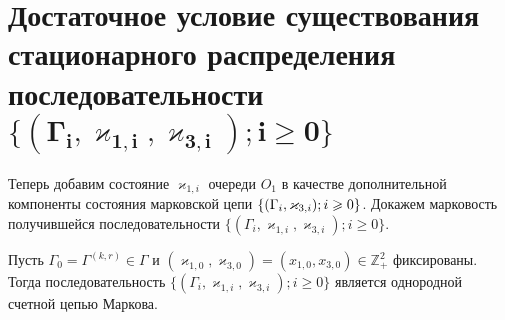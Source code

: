 \section[Достаточное условие существования стационарного распределения последовательности $\{(\Gamma_i,  \varkappa_{1, i}, \varkappa_{3, i}); i \geqslant 0\}$]{Достаточное условие существования стационарного распределения последовательности $\boldsymbol{\{(\Gamma_i,  \varkappa_{1, i}, \varkappa_{3, i}); i \geqslant 0\}}$}
Теперь добавим состояние $\varkappa_{1,i}$ очереди $O_1$ в качестве дополнительной компоненты состояния марковской цепи $\MarkThree$.
Докажем марковость получившейся последовательности $\{(\Gamma_i,  \varkappa_{1, i}, \varkappa_{3, i}); i \geqslant 0\}$.
\begin{theorem}
Пусть $\Gamma_0=\Gamma^{(k, r)}\in \Gamma$ и $(\varkappa_{1, 0},  \varkappa_{3, 0})=(x_{1, 0},  x_{3, 0})\in \mathbb{Z}_+^2$ фиксированы. Тогда последовательность $\{(\Gamma_i,  \varkappa_{1, i}, \varkappa_{3, i}); i \geqslant 0\}$ является однородной счетной цепью Маркова.
\end{theorem}
